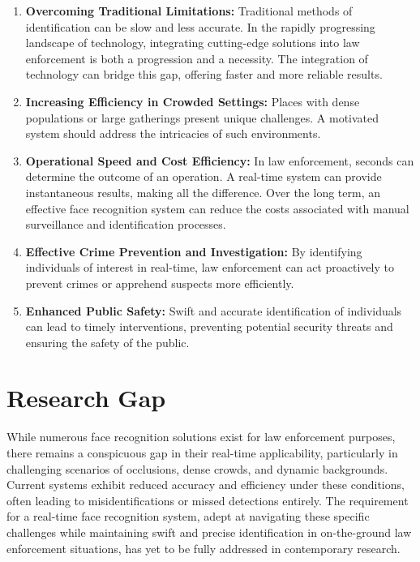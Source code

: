 	\begin{enumerate}
		\item \textbf{Overcoming Traditional Limitations:} Traditional methods of identification can be slow and less accurate. In the rapidly progressing landscape of technology, integrating cutting-edge solutions into law enforcement is both a progression and a necessity. The integration of technology can bridge this gap, offering faster and more reliable results.
		\item \textbf{Increasing Efficiency in Crowded Settings:} Places with dense populations or large gatherings present unique challenges. A motivated system should address the intricacies of such environments.
		\item \textbf{Operational Speed and Cost Efficiency:} In law enforcement, seconds can determine the outcome of an operation. A real-time system can provide instantaneous results, making all the difference. Over the long term, an effective face recognition system can reduce the costs associated with manual surveillance and identification processes.
		\item \textbf{Effective Crime Prevention and Investigation:} By identifying individuals of interest in real-time, law enforcement can act proactively to prevent crimes or apprehend suspects more efficiently.
		\item \textbf{Enhanced Public Safety:} Swift and accurate identification of individuals can lead to timely interventions, preventing potential security threats and ensuring the safety of the public.
	\end{enumerate}

\section{Research Gap}
	While numerous face recognition solutions exist for law enforcement purposes, there remains a conspicuous gap in their real-time applicability, particularly in challenging scenarios of occlusions, dense crowds, and dynamic backgrounds. Current systems exhibit reduced accuracy and efficiency under these conditions, often leading to misidentifications or missed detections entirely. The requirement for a real-time face recognition system, adept at navigating these specific challenges while maintaining swift and precise identification in on-the-ground law enforcement situations, has yet to be fully addressed in contemporary research.
